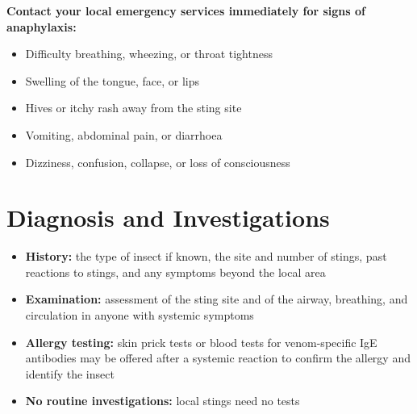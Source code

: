 \textbf{Contact your local emergency services immediately for signs of anaphylaxis:}
\begin{itemize}
    \item Difficulty breathing, wheezing, or throat tightness
    \item Swelling of the tongue, face, or lips
    \item Hives or itchy rash away from the sting site
    \item Vomiting, abdominal pain, or diarrhoea
    \item Dizziness, confusion, collapse, or loss of consciousness
\end{itemize}

\section*{Diagnosis and Investigations}
\begin{itemize}
    \item \textbf{History:} the type of insect if known, the site and number of stings, past reactions to stings, and any symptoms beyond the local area
    \item \textbf{Examination:} assessment of the sting site and of the airway, breathing, and circulation in anyone with systemic symptoms
    \item \textbf{Allergy testing:} skin prick tests or blood tests for venom-specific IgE antibodies may be offered after a systemic reaction to confirm the allergy and identify the insect
    \item \textbf{No routine investigations:} local stings need no tests
\end{itemize}


